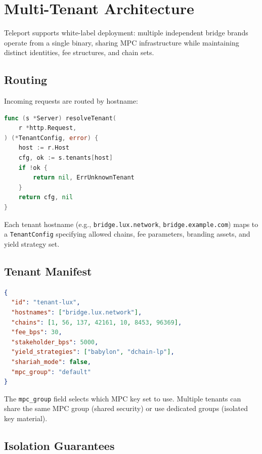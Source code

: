 \section{Multi-Tenant Architecture}

\label{sec:multitenant}

Teleport supports white-label deployment: multiple independent bridge brands operate from a single binary, sharing MPC infrastructure while maintaining distinct identities, fee structures, and chain sets.

\subsection{Routing}

Incoming requests are routed by hostname:

\begin{lstlisting}[language=Go,caption={Hostname-based tenant routing}]
func (s *Server) resolveTenant(
    r *http.Request,
) (*TenantConfig, error) {
    host := r.Host
    cfg, ok := s.tenants[host]
    if !ok {
        return nil, ErrUnknownTenant
    }
    return cfg, nil
}
\end{lstlisting}

Each tenant hostname (e.g., \texttt{bridge.lux.network}, \texttt{bridge.example.com}) maps to a \texttt{TenantConfig} specifying allowed chains, fee parameters, branding assets, and yield strategy set.

\subsection{Tenant Manifest}

\begin{lstlisting}[language=JSON,caption={Tenant manifest example}]
{
  "id": "tenant-lux",
  "hostnames": ["bridge.lux.network"],
  "chains": [1, 56, 137, 42161, 10, 8453, 96369],
  "fee_bps": 30,
  "stakeholder_bps": 5000,
  "yield_strategies": ["babylon", "dchain-lp"],
  "shariah_mode": false,
  "mpc_group": "default"
}
\end{lstlisting}

The \texttt{mpc\_group} field selects which MPC key set to use. Multiple tenants can share the same MPC group (shared security) or use dedicated groups (isolated key material).

\subsection{Isolation Guarantees}

